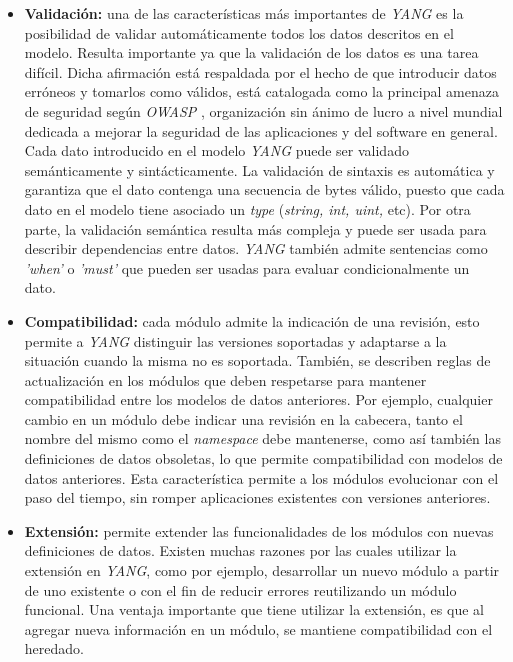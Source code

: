  \begin{itemize}
	\item \textbf{Validación:} una de las características más importantes de \textit{YANG} es la posibilidad de validar automáticamente todos los datos descritos en el modelo. Resulta importante ya que la validación de los datos es una tarea difícil. Dicha afirmación está respaldada por el hecho de que introducir datos erróneos y tomarlos como válidos, está catalogada como la principal amenaza de seguridad según \textit{OWASP} \parencite{owasp}, organización sin ánimo de lucro a nivel mundial dedicada a mejorar la seguridad de las aplicaciones y del software en general. Cada dato introducido en el modelo \textit{YANG} puede ser validado semánticamente y sintácticamente. La validación de sintaxis es automática y garantiza que el dato contenga una secuencia de bytes válido, puesto que cada dato en el modelo tiene asociado un \textit{type} (\textit{string, int, uint,} etc). Por otra parte, la validación semántica resulta más compleja y puede ser usada para describir dependencias entre datos. \textit{YANG} también admite sentencias como \textit{'when'} o \textit{'must'} que pueden ser usadas para evaluar condicionalmente un dato.  
	\item \textbf{Compatibilidad:} cada módulo admite la indicación de una revisión, esto permite a \textit{YANG} distinguir las versiones soportadas y adaptarse a la situación cuando la misma no es soportada. También, se describen reglas de actualización en los módulos que deben respetarse para mantener compatibilidad entre los modelos de datos anteriores. Por ejemplo, cualquier cambio en un módulo debe indicar una revisión en la cabecera, tanto el nombre del mismo como el \textit{namespace} debe mantenerse, como así también las definiciones de datos obsoletas, lo que permite compatibilidad con modelos de datos anteriores. Esta característica permite a los módulos evolucionar con el paso del tiempo, sin romper aplicaciones existentes con versiones anteriores.
	\item \textbf{Extensión:} permite extender las funcionalidades de los módulos con nuevas definiciones de datos. Existen muchas razones por las cuales utilizar la extensión en \textit{YANG}, como por ejemplo, desarrollar un nuevo módulo a partir de uno existente o con el fin de reducir errores reutilizando un módulo funcional. Una ventaja importante que tiene utilizar la extensión, es que al agregar nueva información en un módulo, se mantiene compatibilidad con el heredado.
\end{itemize}

